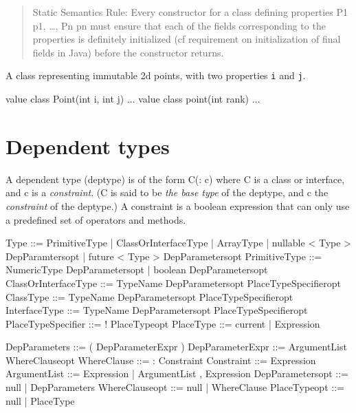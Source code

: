 \begin{quotation}
    {\sc Static Semantics Rule:}  Every constructor for a class defining
   properties {\cf P1 p1, \ldots, Pn pn} must ensure that each of the fields
   corresponding to the properties is definitely initialized (cf
   requirement on initialization of final fields in Java) before the
   constructor returns.  
\end{quotation}


\begin{example}
 A class representing immutable 2d points, with two properties {\tt i} and 
{\tt j}.
  \begin{x10}
   value class Point(int i, int j) { ... }
   value class point(int rank) { ... }
  \end{x10}
  
\end{example}

\section{Dependent types}\label{DepType:DepType}

A dependent type (deptype) is of the form {\cf C(: c)} where {\cf C} is a class
or interface, and {\cf c} is a {\em constraint}. ({\cf C} is said to be 
{\em the base type} of the deptype, and {\cf c} the {\em constraint} of the deptype.)  A
constraint is a boolean expression that can only use a predefined set
of operators and methods. 

\begin{x10}
Type  ::=   PrimitiveType
         | ClassOrInterfaceType
         | ArrayType
         | nullable < Type > DepParamtersopt
         | future < Type > DepParametersopt
PrimitiveType ::= NumericType DepParametersopt
         | boolean DepParametersopt
ClassOrInterfaceType   ::= 
  TypeName DepParametersopt PlaceTypeSpecifieropt
ClassType              ::= 
  TypeName DepParametersopt PlaceTypeSpecifieropt
InterfaceType          ::= 
  TypeName DepParametersopt PlaceTypeSpecifieropt
PlaceTypeSpecifier     ::=  ! PlaceTypeopt
PlaceType              ::= current | Expression

DepParameters    ::= ( DepParameterExpr ) 
DepParameterExpr ::= ArgumentList WhereClauseopt
WhereClause      ::= : Constraint
Constraint       ::= Expression
ArgumentList     ::= Expression 
   | ArgumentList , Expression
DepParametersopt ::= null | DepParameters
WhereClauseopt   ::= null | WhereClause
PlaceTypeopt     ::= null | PlaceType
\end{x10}

